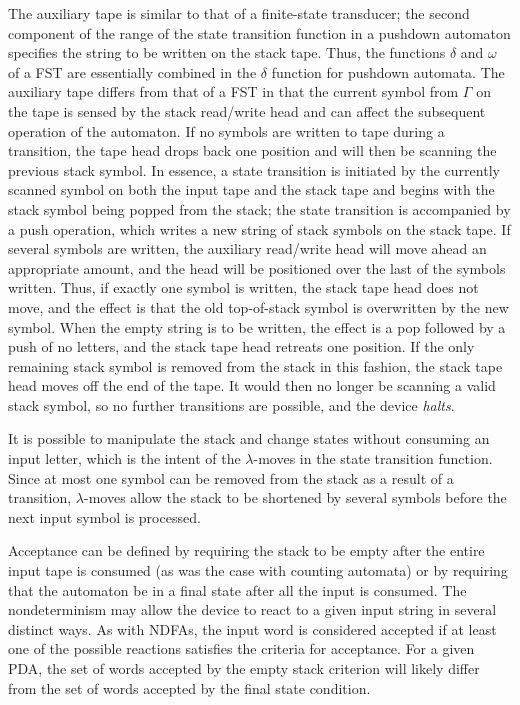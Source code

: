 The auxiliary tape is similar to that of a finite-state transducer; the second
component of the range of the state transition function in a pushdown automaton
specifies the string to be written on the stack tape. Thus, the functions
$\delta$ and $\omega$ of a FST are essentially combined in the $\delta$ function for
pushdown automata. The auxiliary tape differs from that of a FST in that the
current symbol from $\Gamma$ on the tape is sensed by the stack read/write head
and can affect the subsequent operation of the automaton. If no symbols are
written to tape during a transition, the tape head drops back one position and
will then be scanning the previous stack symbol. In essence, a state transition
is initiated by the currently scanned symbol on both the input tape and the
stack tape and begins with the stack symbol being popped from the stack; the
state transition is accompanied by a push operation, which writes a new string
of stack symbols on the stack tape. If several symbols are written, the
auxiliary read/write head will move ahead an appropriate amount, and the head
will be positioned over the last of the symbols written. Thus, if exactly one
symbol is written, the stack tape head does not move, and the effect is that the
old top-of-stack symbol is overwritten by the new symbol. When the empty string
is to be written, the effect is a pop followed by a push of no letters, and the
stack tape head retreats one position. If the only remaining stack symbol is
removed from the stack in this fashion, the stack tape head moves off the end
of the tape. It would then no longer be scanning a valid stack symbol, so no
further transitions are possible, and the device \emph{halts}.

It is possible to manipulate the stack and change states without consuming an
input letter, which is the intent of the $\lambda$-moves in the state transition
function. Since at most one symbol can be removed from the stack as a result of
a transition, $\lambda$-moves allow the stack to be shortened by several symbols
before the next input symbol is processed.

Acceptance can be defined by requiring the stack to be empty after the entire
input tape is consumed (as was the case with counting automata) or by requiring
that the automaton be in a final state after all the input is consumed. The
nondeterminism may allow the device to react to a given input string in several
distinct ways. As with NDFAs, the input word is considered accepted if at least
one of the possible reactions satisfies the criteria for acceptance. For a given
PDA, the set of words accepted by the empty stack criterion will likely differ
from the set of words accepted by the final state condition.

